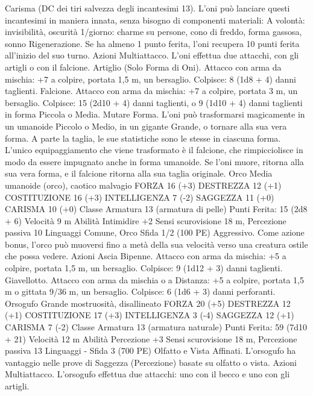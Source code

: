 \begin{multicols}{2}
Carisma (DC dei tiri salvezza degli incantesimi 13). L’oni può
lanciare questi incantesimi in maniera innata, senza bisogno di
componenti materiali:
A volontà: invisibilità, oscurità
1/giorno: charme su persone, cono di freddo, forma gassosa,
sonno
Rigenerazione. Se ha almeno 1 punto ferita, l’oni recupera 10
punti ferita all’inizio del suo turno.
Azioni
Multiattacco. L’oni effettua due attacchi, con gli artigli o con il
falcione.
Artiglio (Solo Forma di Oni). Attacco con arma da mischia: +7
a colpire, portata 1,5 m, un bersaglio.
Colpisce: 8 (1d8 + 4) danni taglienti.
Falcione. Attacco con arma da mischia: +7 a colpire, portata 3
m, un bersaglio.
Colpisce: 15 (2d10 + 4) danni taglienti, o 9 (1d10 + 4) danni
taglienti in forma Piccola o Media.
Mutare Forma. L’oni può trasformarsi magicamente in un
umanoide Piccolo o Medio, in un gigante Grande, o tornare alla sua
vera forma. A parte la taglia, le sue statistiche sono le stesse in
ciascuna forma. L’unico equipaggiamento che viene trasformato è il
falcione, che rimpicciolisce in modo da essere impugnato anche in
forma umanoide. Se l’oni muore, ritorna alla sua vera forma, e il
falcione ritorna alla sua taglia originale.
Orco
Media umanoide (orco), caotico malvagio
FORZA 16 (+3)
DESTREZZA 12 (+1)
COSTITUZIONE 16 (+3)
INTELLIGENZA 7 (-2)
SAGGEZZA 11 (+0)
CARISMA 10 (+0)
Classe Armatura 13 (armatura di pelle)
\hspace*{0pt}\hfill{Punti Ferita}: 15 (2d8 + 6)
Velocità 9 m
Abilità Intimidire +2
Sensi scurovisione 18 m, Percezione passiva 10
Linguaggi Comune, Orco
Sfida 1/2 (100 PE)
Aggressivo. Come azione bonus, l’orco può muoversi fino a
metà della sua velocità verso una creatura ostile che possa
vedere.
Azioni
Ascia Bipenne. Attacco con arma da mischia: +5 a colpire,
portata 1,5 m, un bersaglio.
Colpisce: 9 (1d12 + 3) danni taglienti.
Giavellotto. Attacco con arma da mischia o a Distanza: +5 a
colpire, portata 1,5 m o gittata 9/36 m, un bersaglio.
Colpisce: 6 (1d6 + 3) danni perforanti.
Orsogufo
Grande mostruosità, disallineato
FORZA 20 (+5)
DESTREZZA 12 (+1)
COSTITUZIONE 17 (+3)
INTELLIGENZA 3 (-4)
SAGGEZZA 12 (+1)
CARISMA 7 (-2)
Classe Armatura 13 (armatura naturale)
\hspace*{0pt}\hfill{Punti Ferita}: 59 (7d10 + 21)
Velocità 12 m
Abilità Percezione +3
Sensi scurovisione 18 m, Percezione passiva 13
Linguaggi -
Sfida 3 (700 PE)
Olfatto e Vista Affinati. L’orsogufo ha vantaggio nelle prove di
Saggezza (Percezione) basate su olfatto o vista.
Azioni
Multiattacco. L’orsogufo effettua due attacchi: uno con il becco
e uno con gli artigli.

\end{multicols}
